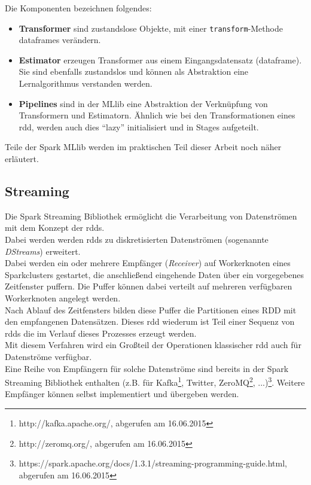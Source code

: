 Die Komponenten bezeichnen folgendes:
\begin{itemize}
	\item \textbf{Transformer} sind zustandslose Objekte, mit einer \lstinline|transform|-Methode \glspl{dataframe} verändern.
	\item \textbf{Estimator} erzeugen Transformer aus einem Eingangsdatensatz (\gls{dataframe}). Sie sind ebenfalls zustandslos und können als Abstraktion eine Lernalgorithmus verstanden werden.
	\item \textbf{Pipelines} sind in der MLlib eine Abstraktion der Verknüpfung von Transformern und Estimatorn. Ähnlich wie bei den Transformationen eines \gls{rdd}, werden auch dies "`lazy"' initialisiert und in Stages aufgeteilt.
\end{itemize}

Teile der Spark MLlib werden im praktischen Teil dieser Arbeit noch näher erläutert.\\

\subsection{Streaming}
Die Spark Streaming Bibliothek ermöglicht die Verarbeitung von Datenströmen mit dem Konzept der \glspl{rdd}.\\

Dabei werden werden \glspl{rdd} zu diskretisierten Datenströmen (sogenannte \textit{DStreams}) erweitert.\\

Dabei werden ein oder mehrere Empfänger (\textit{Receiver}) auf Workerknoten eines Sparkclusters gestartet, die anschließend eingehende Daten über ein vorgegebenes Zeitfenster puffern. Die Puffer können dabei verteilt auf mehreren verfügbaren Workerknoten angelegt werden.\\

Nach Ablauf des Zeitfensters bilden diese Puffer die Partitionen eines RDD mit den empfangenen Datensätzen. Dieses \gls{rdd} wiederum ist Teil einer Sequenz von \glspl{rdd} die im Verlauf dieses Prozesses erzeugt werden.\\

Mit diesem Verfahren wird ein Großteil der Operationen klassischer \gls{rdd} auch für Datenströme verfügbar.\\

Eine Reihe von Empfängern für solche Datenströme sind bereits in der Spark Streaming Bibliothek enthalten (z.B. für Kafka\footnote{http://kafka.apache.org/, abgerufen am 16.06.2015}, Twitter, ZeroMQ\footnote{http://zeromq.org/, abgerufen am 16.06.2015}, ...)\footnote{https://spark.apache.org/docs/1.3.1/streaming-programming-guide.html, abgerufen am 16.06.2015}. Weitere Empfänger können selbst implementiert und übergeben werden.\\

